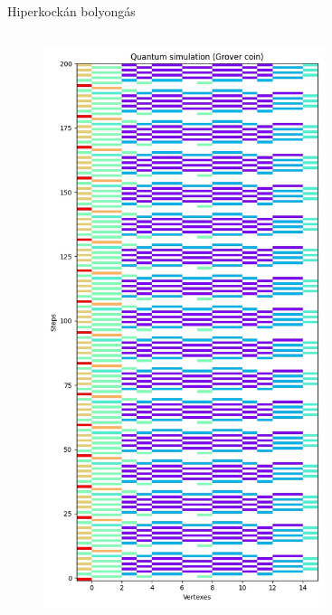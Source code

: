 \documentclass[aspectratio=169]{beamer}
\begin{document}
\begin{frame}{Hiperkockán bolyongás}
\begin{columns}[onlytextwidth]
    \begin{column}{.23\textwidth}
      \begin{figure}
        \includegraphics[width=0.9\textwidth]{./tdk_figures/results/hypercube/grover.jpg}
      \end{figure}
    \end{column}
    \begin{column}{.23\textwidth}
      \begin{figure}

\end{figure}
\end{column}
\end{columns}
\end{frame}
\end{document}
